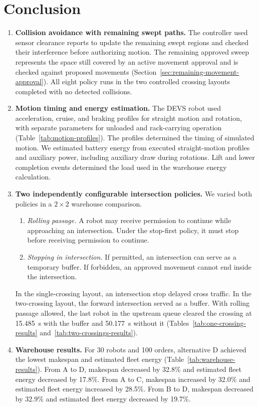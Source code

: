 \documentclass[11pt,a4paper]{article}
\begin{document}
\section{Conclusion}
\begin{enumerate}
\item \textbf{Collision avoidance with remaining swept paths.}
The controller used sensor clearance reports to update the remaining
swept regions and checked their interference before authorizing motion.
The remaining approved sweep represents the space still covered by an
active movement approval and is checked against proposed movements
(Section~\ref{sec:remaining-movement-approval}).
All eight policy runs in the two controlled crossing layouts completed
with no detected collisions.

\item \textbf{Motion timing and energy estimation.}
The DEVS robot used acceleration, cruise, and braking profiles for
straight motion and rotation, with separate parameters for unloaded
and rack-carrying operation (Table~\ref{tab:motion-profiles}).
The profiles determined the timing of simulated motion. We estimated
battery energy from executed straight-motion profiles and auxiliary
power, including auxiliary draw during rotations. Lift and lower
completion events determined the load used in the warehouse energy
calculation.

\item \textbf{Two independently configurable intersection policies.}
We varied both policies in a $2\times2$ warehouse comparison.
\begin{enumerate}
\item \emph{Rolling passage.} A robot may receive permission to
continue while approaching an intersection. Under the stop-first
policy, it must stop before receiving permission to continue.
\item \emph{Stopping in intersection.} If permitted, an intersection
can serve as a temporary buffer. If forbidden, an approved movement
cannot end inside the intersection.
\end{enumerate}
In the single-crossing layout, an intersection stop delayed cross
traffic. In the two-crossing layout, the forward intersection served as a
buffer. With rolling passage allowed, the last robot in the upstream
queue cleared the crossing at 15.485~s with the buffer and 50.177~s
without it (Tables~\ref{tab:one-crossing-results}
and~\ref{tab:two-crossings-results}).

\item \textbf{Warehouse results.}
For 30 robots and 100 orders, alternative D achieved the lowest makespan and estimated fleet energy (Table~\ref{tab:warehouse-results}).
From A to D, makespan decreased by 32.8\% and estimated fleet
energy decreased by 17.8\%.
From A to C, makespan increased by 32.0\% and estimated fleet
energy increased by 28.5\%.
From B to D, makespan decreased by 32.9\% and estimated fleet
energy decreased by 19.7\%.
\end{enumerate}
\end{document}
